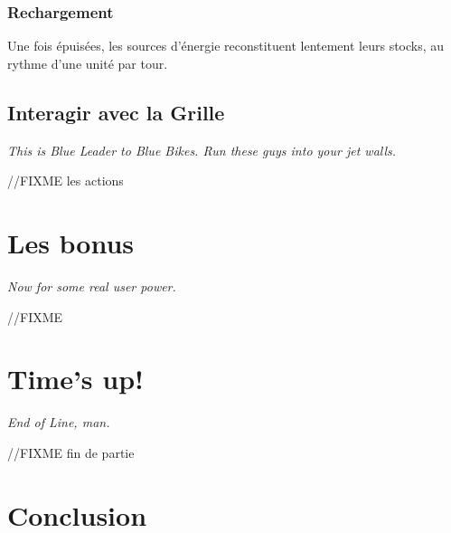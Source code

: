 \subsubsection{Rechargement}

Une fois épuisées, les sources d'énergie reconstituent lentement leurs
stocks, au rythme d'une unité par tour.



        \subsection{Interagir avec la Grille}
        \emph{This is Blue Leader to Blue Bikes. Run these guys into your jet walls.}

        //FIXME les actions


\newpage
\section{Les bonus} \label{section-bonus}
\emph{Now for some real user power.}

//FIXME

\newpage
\section{Time's up!}
\emph{End of Line, man.}

//FIXME fin de partie

\newpage
\section{Conclusion}
